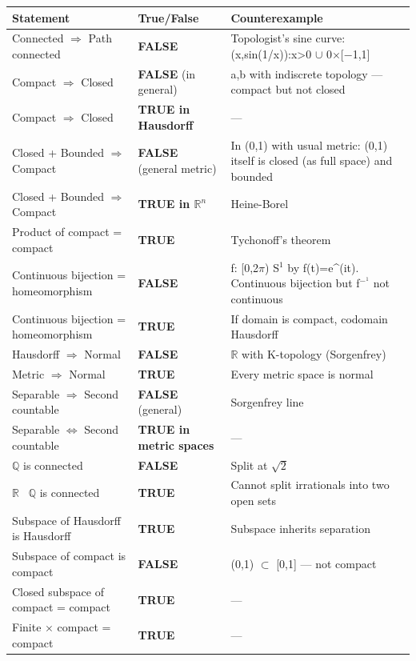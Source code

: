 \documentclass[12pt,a4paper,openany]{book}
\begin{document}
{{\begin{center}
\begin{tabular}{|l|l|l|}
\hline
\textbf{Statement} & \textbf{True/False} & \textbf{Counterexample} \\
\hline
Connected $\Longrightarrow$ Path connected & \textbf{FALSE} & Topologist's sine curve: {(x,sin(1/x)):x>0} $\cup$ {0}$\times$[−1,1] \\
\hline
Compact $\Longrightarrow$ Closed & \textbf{FALSE} (in general) & {a,b} with indiscrete topology — compact but not closed \\
\hline
Compact $\Longrightarrow$ Closed & \textbf{TRUE in Hausdorff} & — \\
\hline
Closed + Bounded $\Longrightarrow$ Compact & \textbf{FALSE} (general metric) & In (0,1) with usual metric: (0,1) itself is closed (as full space) and bounded \\
\hline
Closed + Bounded $\Longrightarrow$ Compact & \textbf{TRUE in $\mathbb{R}^n$} & Heine-Borel \\
\hline
Product of compact = compact & \textbf{TRUE} & Tychonoff's theorem \\
\hline
Continuous bijection = homeomorphism & \textbf{FALSE} & f: [0,2$\pi$)  S$^1$ by f(t)=e^(it). Continuous bijection but f$^{-}^1$ not continuous \\
\hline
Continuous bijection = homeomorphism & \textbf{TRUE} & If domain is compact, codomain Hausdorff \\
\hline
Hausdorff $\Longrightarrow$ Normal & \textbf{FALSE} & $\mathbb{R}$ with K-topology (Sorgenfrey) \\
\hline
Metric $\Longrightarrow$ Normal & \textbf{TRUE} & Every metric space is normal \\
\hline
Separable $\Longrightarrow$ Second countable & \textbf{FALSE} (general) & Sorgenfrey line \\
\hline
Separable $\Longleftrightarrow$ Second countable & \textbf{TRUE in metric spaces} & — \\
\hline
$\mathbb{Q}$ is connected & \textbf{FALSE} & Split at $\sqrt{2}$ \\
\hline
$\mathbb{R}$ \ $\mathbb{Q}$ is connected & \textbf{TRUE} & Cannot split irrationals into two open sets \\
\hline
Subspace of Hausdorff is Hausdorff & \textbf{TRUE} & Subspace inherits separation \\
\hline
Subspace of compact is compact & \textbf{FALSE} & (0,1) $\subset$ [0,1] — not compact \\
\hline
Closed subspace of compact = compact & \textbf{TRUE} & — \\
\hline
Finite $\times$ compact = compact & \textbf{TRUE} & — \\
\hline
\end{tabular}
\end{center}

}}
\end{document}
